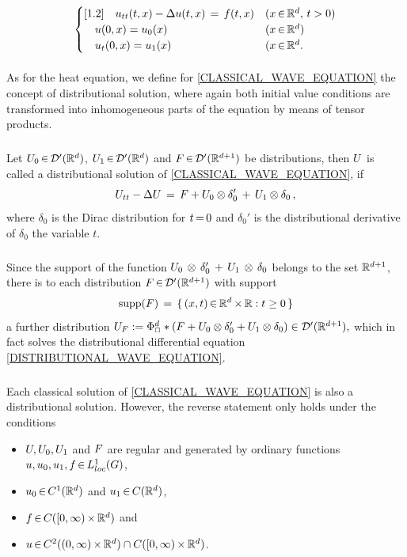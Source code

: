 \documentclass[11pt,twoside]{article}
\begin{document}
\begin{itemize}[leftmargin=4mm]
\begin{equation}\label{CLASSICAL_WAVE_EQUATION}
\begin{cases}[1.2]
\quad u_{tt}(t,x) - \Delta u(t,x) \,=\, f(t,x) & (x {\,\in\,} {\mathbb{R}}^d, \, t > 0) \\
\quad u(0,x) = u_0(x)                       & (x {\,\in\,} {\mathbb{R}}^d) \\
\quad u_t(0,x) = u_1(x)                     & (x {\,\in\,} {\mathbb{R}}^d. \\
\end{cases}
\end{equation}

\paragraph{} %
As for the heat equation,
we define for \eqref{CLASSICAL_WAVE_EQUATION}
the concept of distributional solution,
where again both initial value conditions are transformed
into inhomogeneous parts of the equation by means of tensor products.

\subparagraph{}
Let $U_0 {\,\in\,} {\mathcal{D}}'({\mathbb{R}}^d)$, $U_1 {\,\in\,} {\mathcal{D}}'({\mathbb{R}}^d)$
and $F {\,\in\,} {\mathcal{D}}'({\mathbb{R}}^{d+1})$ be distributions,
then $U$ is called a distributional solution
of \eqref{CLASSICAL_WAVE_EQUATION},
if
\begin{equation}\label{DISTRIBUTIONAL_WAVE_EQUATION}
U_{tt} - \Delta U \,=\,
F + U_0 \otimes \delta_0' \, + \, U_1 \otimes \delta_0 \,,
\end{equation}
where $\delta_0$ is the Dirac distribution for $t {\,=\,} 0$ 
and $\delta_0'$ is the distributional derivative of $\delta_0$
{\wrt} the variable $t$.

\subparagraph{}
Since the support of the function
$U_0 \, \otimes \, \delta_0' \, + \, U_1 \, \otimes \, \delta_0$
belongs to the set ${\mathbb{R}}^{d+1}$,
there is to each distribution $F {\,\in\,} {\mathcal{D}}'({\mathbb{R}}^{d+1})$ with support
\[
\operatorname{supp}(F) \,=\, \{\, (x,t) {\,\in\,} {\mathbb{R}}^d {\,\times\,} {\mathbb{R}}: t \geq 0 \,\}
\]
a further distribution
$
U_F :=
\Phi_{\Box}^d \ast (F + U_0 \otimes \delta'_0
+ U_1 \otimes \delta_0)
\in {\mathcal{D}}'({\mathbb{R}}^{d+1}),
$
which in fact solves the distributional differential equation
\eqref{DISTRIBUTIONAL_WAVE_EQUATION}.

\subparagraph{}
Each classical solution of \eqref{CLASSICAL_WAVE_EQUATION}
is also a distributional solution.
However,
the reverse statement only holds under the conditions 

\begin{itemize}[leftmargin=9mm]
\item[a.]
$U, U_0, U_1$ and $F$ are regular
and generated by ordinary functions $u, u_0, u_1, f {\,\in\,} L_{loc}^1(G)$,

\item[b.]
$u_0 {\,\in\,} C^1({\mathbb{R}}^d)$ and $u_1 {\,\in\,} C({\mathbb{R}}^d)$,

\item[c.]
$f {\,\in\,} C([0,\infty) {\,\times\,} {\mathbb{R}}^d)$ and

\item[d.]
$u {\,\in\,} C^2((0,\infty) {\,\times\,} {\mathbb{R}}^d) \cap C([0,\infty) {\,\times\,} {\mathbb{R}}^d)$.
\end{itemize}
\end{itemize}
\end{document}
